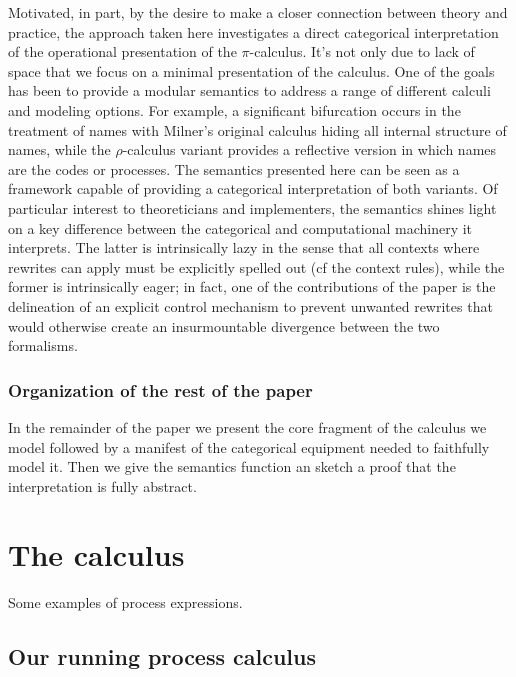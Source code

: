 \documentclass[]{acm_proc_article-sp}
\numberwithin{equation}{subsection}
\newcommand{\pic}{$\pi$-calculus}
\begin{document}
Motivated, in part, by the desire to make a closer connection between
theory and practice, the approach taken here investigates a direct
categorical interpretation of the operational presentation of the
{\pic}. It's not only due to lack of space that we focus on a minimal
presentation of the calculus. One of the goals has been to provide a
modular semantics to address a range of different calculi and modeling
options. For example, a significant bifurcation occurs in the
treatment of names with Milner's original calculus hiding all internal
structure of names, while the $\rho$-calculus variant provides a
reflective version in which names are the codes or processes. The
semantics presented here can be seen as a framework capable of
providing a categorical interpretation of both variants. Of particular
interest to theoreticians and implementers, the semantics shines light
on a key difference between the categorical and computational
machinery it interprets. The latter is intrinsically lazy in the sense
that all contexts where rewrites can apply must be explicitly spelled
out (cf the context rules), while the former is intrinsically eager;
in fact, one of the contributions of the paper is the delineation of
an explicit control mechanism to prevent unwanted rewrites that would
otherwise create an insurmountable divergence between the two formalisms.

\subsubsection{Organization of the rest of the paper}

In the remainder of the paper we present the core fragment of the
calculus we model followed by a manifest of the categorical equipment
needed to faithfully model it. Then we give the semantics function an
sketch a proof that the interpretation is fully abstract.


\section{The calculus}

Some examples of process expressions. \\

\subsection{Our running process calculus}
\end{document}
